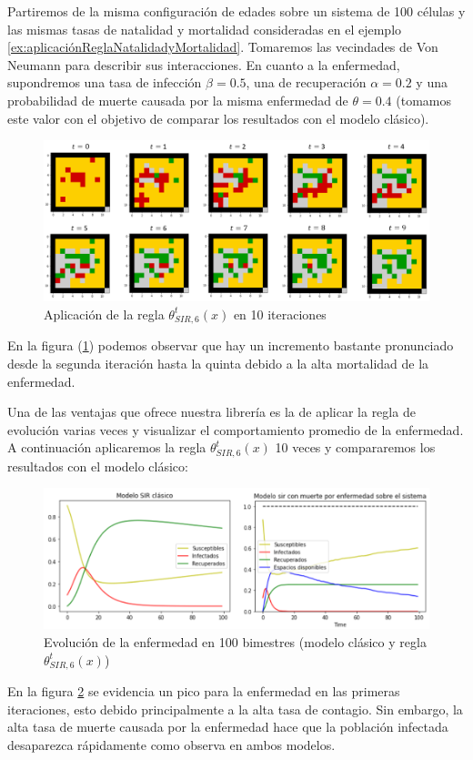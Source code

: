 \begin{example}\label{ex:muertePorEnfermedadClásicovsModeloEnAC}
Partiremos de la misma configuración de edades sobre un sistema de 100 células y las mismas tasas de natalidad y mortalidad consideradas en el ejemplo \ref{ex:aplicaciónReglaNatalidadyMortalidad}. Tomaremos las vecindades de Von Neumann para describir sus interacciones. En cuanto a la enfermedad, supondremos una tasa de infección $\beta=0.5$, una de recuperación $\alpha=0.2$ y una probabilidad de muerte causada por la misma enfermedad de $\theta=0.4$ (tomamos este valor con el objetivo de comparar los resultados con el modelo clásico).

\begin{figure}[h]
  \centering
    \includegraphics[width=1\textwidth]{Imagenes/evolucionesMuertePorEnfermedad.PNG}
    \caption{Aplicación de la regla $\theta_{SIR,6}^t(x)$ en 10 iteraciones}
    \label{fig:muertePorEnfermedad10Veces}
\end{figure}

En la figura (\ref{fig:muertePorEnfermedad10Veces}) podemos observar que hay un incremento bastante pronunciado desde la segunda iteración hasta la quinta debido a la alta mortalidad de la enfermedad.

Una de las ventajas que ofrece nuestra librería es la de aplicar la regla de evolución varias veces y visualizar el comportamiento promedio de la enfermedad. A continuación aplicaremos la regla $\theta_{SIR,6}^t(x)$ 10 veces y compararemos los resultados con el modelo clásico:

\begin{figure}[h]
  \centering
    \includegraphics[width=1\textwidth]{Imagenes/solucionesMuertePorEnfermedad.PNG}
    \caption{Evolución de la enfermedad en 100 bimestres (modelo clásico y regla $\theta_{SIR,6}^t(x)$)}
    \label{fig:evolución100bimestres}
\end{figure}
En la figura \ref{fig:evolución100bimestres} se evidencia un pico para la enfermedad en las primeras iteraciones, esto debido principalmente a la alta tasa de contagio. Sin embargo, la alta tasa de muerte causada por la enfermedad hace que la población infectada desaparezca rápidamente como observa en ambos modelos.


\end{example}
